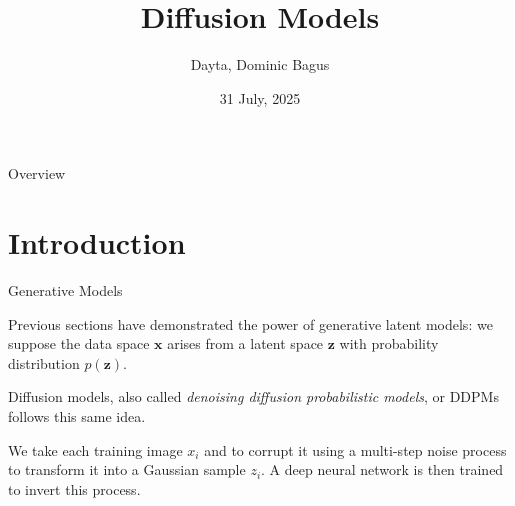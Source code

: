 \documentclass[aspectratio=169,xcolor=dvipsnames]{beamer}
\title[PBL Reading Club]{Diffusion Models}
\author[Dayta] {Dayta, Dominic Bagus}
\institute[NAIST] %
{
    Mathematical Informatics Laboratory \\
    Nara Institute of Science and Technology 
    \vskip 3pt
}
\date{31 July, 2025} %
\theoremstyle{named}
\begin{document}
\begin{frame}
    \titlepage
\end{frame}

\begin{frame}{Overview}
    \tableofcontents
\end{frame}

\section{Introduction}

\begin{frame}{Generative Models}

Previous sections have demonstrated the power of \alert{generative latent models}: we suppose the data space $\mathbf{x}$ arises from a latent space $\mathbf{z}$ with probability distribution $p(\mathbf{z})$.

\vspace{0.5cm}

\alert{Diffusion models}, also called \textit{denoising diffusion probabilistic models}, or DDPMs follows this same idea.

\vspace{0.5cm}

We take each training image $x_i$ and to corrupt it using a multi-step noise process to transform it into a Gaussian sample $z_i$. A deep neural network is then trained to invert this process.

\end{frame}

\end{document}
